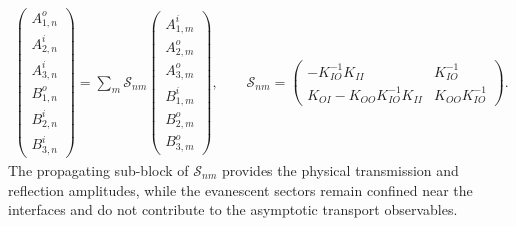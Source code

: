 \documentclass[aps,prb,onecolumn,longbibliography,nofootinbib,citeautoscript,10pt]{revtex4-2}
\begin{document}
\begin{align}
\begin{pmatrix}
A_{1,n}^{o}\\
A_{2,n}^{i}\\
A_{3,n}^{i}\\
B_{1,n}^{o}\\
B_{2,n}^{i}\\
B_{3,n}^{i} \end{pmatrix}
= \sum_m
\mathcal{S}_{nm}
\begin{pmatrix}
A_{1,m}^{i}\\
A_{2,m}^{o}\\
A_{3,m}^{o}\\
B_{1,m}^{i}\\
B_{2,m}^{o}\\
B_{3,m}^{o}
\end{pmatrix} , 
\qquad
\mathcal{S}_{nm}=
\begin{pmatrix}
-K_{IO}^{-1}K_{II} & K_{IO}^{-1}\\[2pt]
K_{OI}-K_{OO}K_{IO}^{-1}K_{II} & K_{OO}K_{IO}^{-1}
\end{pmatrix}.
\end{align}
The propagating sub-block of $\mathcal{S}_{nm}$ provides the physical transmission and reflection amplitudes, while the evanescent sectors remain confined near the interfaces and do not contribute to the asymptotic transport observables.


\end{document}
